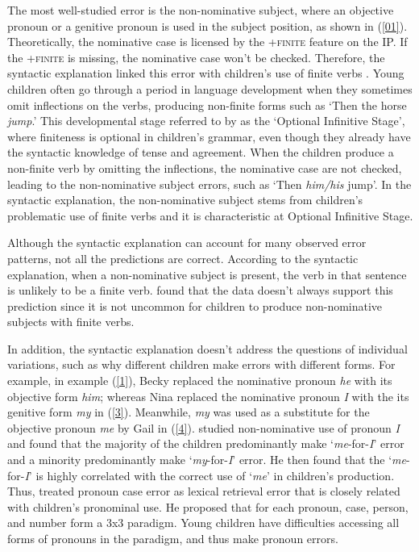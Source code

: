 The most well-studied error is the non-nominative subject, where an objective pronoun or a genitive pronoun is used in the subject position, as shown in (\ref{01}). Theoretically, the nominative case is licensed by the +\textsc{finite} feature on the IP. If the +\textsc{finite} is missing, the nominative case won't be checked. Therefore, the syntactic explanation linked this error with children's use of finite verbs \citep[e.g.][]{vainikka1993case,wexler1996, schutze1996subject}. Young children often go through a period in language development when they sometimes omit inflections on the verbs, producing non-finite forms such as `Then the horse \textit{jump}.' This developmental stage referred to by \cite{wexler1994,wexler1998,wexler2000} as the `Optional Infinitive Stage', where finiteness is optional in children's grammar, even though they already have the syntactic knowledge of tense and agreement. When the children produce a non-finite verb by omitting the inflections, the nominative case are not checked, leading to the non-nominative subject errors, such as `Then \textit{him/his} jump'. In the syntactic explanation, the non-nominative subject stems from children's problematic use of finite verbs and it is characteristic at Optional Infinitive Stage.

Although the syntactic explanation can account for many observed error patterns, not all the predictions are correct. According to the syntactic explanation, when a non-nominative subject is present, the verb in that sentence is unlikely to be a finite verb. \cite{pine2005testing} found that the data doesn't always support this prediction since it is not uncommon for children to produce non-nominative subjects with finite verbs. 

In addition, the syntactic explanation doesn't address the questions of individual variations, such as why different children make errors with different forms. For example, in example (\ref{1}), Becky replaced the nominative pronoun \textit{he} with its objective form \textit{him}; whereas Nina replaced the nominative pronoun \textit{I} with the its genitive form \textit{my} in (\ref{3}). Meanwhile, \textit{my} was used as a substitute for the objective pronoun \textit{me} by Gail in (\ref{4}).  \cite{rispoli1998} studied non-nominative use of pronoun \textit{I} and found that the majority of the children predominantly make `\textit{me}-for-\textit{I}' error and a minority predominantly make `\textit{my}-for-\textit{I}' error. He then found that the `\textit{me}-for-\textit{I}' is highly correlated with the correct use of `\textit{me}' in children's production. Thus, \cite{rispoli1998,rispoli1999,rispoli2005} treated pronoun case error as lexical retrieval error that is closely related with children's pronominal use. He proposed that for each pronoun, case, person, and number form a 3x3 paradigm. Young children have difficulties accessing all forms of pronouns in the paradigm, and thus make pronoun errors. 




